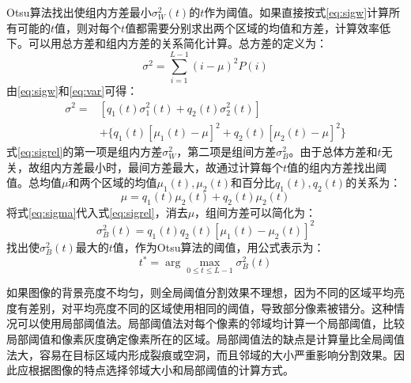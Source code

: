 Otsu算法找出使组内方差最小$\sigma_W^2(t)$的$t$作为阈值。如果直接按式\ref{eq:sigw}计算所有可能的$t$值，则对每个$t$值都需要分别求出两个区域的均值和方差，计算效率低下。可以用总方差和组内方差的关系简化计算。总方差的定义为：
\begin{equation}
  \label{eq:var}
  \sigma^2=\sum_{i=1}^{L-1}(i-\mu)^2P(i)
\end{equation}
由\eqref{eq:sigw}和\eqref{eq:var}可得：
\begin{equation}\begin{split}
  \label{eq:sigrel}
  \sigma^2 =&[q_1(t)\sigma_1^2(t)+q_2(t)\sigma_2^2(t)] \\
  &  +\{q_1(t)[\mu_1(t)-\mu]^2+q_2(t)[\mu_2(t)-\mu]^2\}
\end{split}\end{equation}
式\eqref{eq:sigrel}的第一项是组内方差$\sigma_W^2$，第二项是组间方差$\sigma_B^2$。由于总体方差和$t$无关，故组内方差最小时，最间方差最大，故通过计算每个$t$值的组内方差找出阈值。总均值$\mu$和两个区域的均值$\mu_1(t),\mu_2(t)$和百分比$q_1(t),q_2(t)$的关系为：
\begin{equation}
  \label{eq:sigma}
  \mu=q_1(t)\mu_2(t)+q_2(t)\mu_2(t)
\end{equation}
将式\eqref{eq:sigma}代入式\eqref{eq:sigrel}，消去$\mu$，组间方差可以简化为：
\begin{equation}
  \label{eq:sigb}
  \sigma_B^2(t)=q_1(t)q_2(t)[\mu_1(t)-\mu_2(t)]^2
\end{equation}
找出使$\sigma_B^2(t)$最大的$t$值，作为Otsu算法的阈值，用公式表示为：
\begin{equation}
  \label{eq:otsu}
  t^{*}=\arg\max_{0\leqslant t\leqslant L-1}\sigma_B^2(t)
\end{equation}

如果图像的背景亮度不均匀，则全局阈值分割效果不理想，因为不同的区域平均亮度有差别，对平均亮度不同的区域使用相同的阈值，导致部分像素被错分。这种情况可以使用局部阈值法。局部阈值法对每个像素的邻域均计算一个局部阈值，比较局部阈值和像素灰度确定像素所在的区域。局部阈值法的缺点是计算量比全局阈值法大，容易在目标区域内形成裂痕或空洞，而且邻域的大小严重影响分割效果。因此应根据图像的特点选择邻域大小和局部阈值的计算方式。



